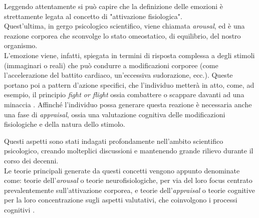 Leggendo attentamente si può capire che la definizione delle emozioni è strettamente legata al concetto di "attivazione fisiologica".\\
Quest'ultima, in gergo psicologico scientifico, viene chiamata \textit{arousal}, ed è una reazione corporea che sconvolge lo stato omeostatico, di equilibrio, del nostro organismo.\\
L'emozione viene, infatti, spiegata in termini di risposta complessa a degli stimoli (immaginari o reali) che può condurre a modificazioni corporee (come l'accelerazione del battito cardiaco, un'eccessiva sudorazione, ecc.). Queste portano poi a pattern d'azione specifici, che l'individuo metterà in atto, come, ad esempio, il principio \textit{fight or flight} ossia combattere o scappare davanti ad una minaccia \parencite{Lazarus}.\clearpage
Affinché l'individuo possa generare questa reazione è necessaria anche una fase di \textit{appraisal}, ossia una valutazione cognitiva delle modificazioni fisiologiche e della natura dello stimolo. 

Questi aspetti sono stati indagati profondamente nell'ambito scientifico psicologico, creando molteplici discussioni e mantenendo grande rilievo durante il corso dei decenni.\\
Le teorie principali generate da questi concetti vengono appunto denominate come: teorie dell'\textit{arousal} o teorie neurofisiologiche, per via del loro focus centrato prevalentemente sull'attivazione corporea, e teorie dell'\textit{appraisal} o teorie cognitive per la loro concentrazione sugli aspetti valutativi, che coinvolgono i processi cognitivi \parencite{come_funzionano_le_emozioni}.

